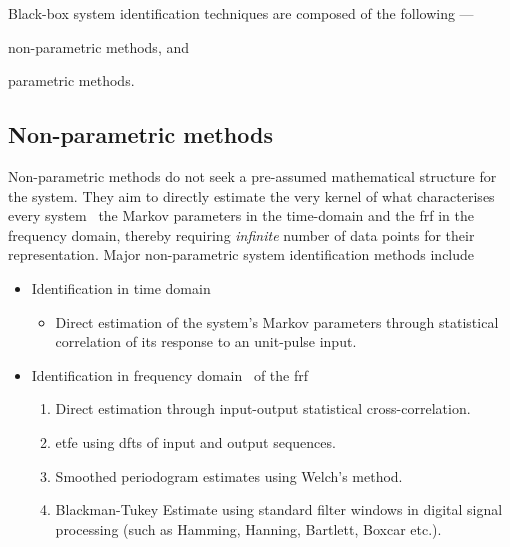 
Black-box system identification techniques are composed of the following ---
\begin{enumerate*}[label=\emph{\alph*})]
     \item non-parametric methods, and
     \item parametric methods.
 \end{enumerate*}

\vspace*{-3mm}
\subsection{Non-parametric methods}
\addlines
Non-parametric methods do not seek  a pre-assumed mathematical structure for the
system. They  aim to  directly estimate  the very  kernel of  what characterises
every system \viz~the Markov parameters in the time-domain  and the \gls{frf}
in the frequency domain, thereby requiring \emph{infinite} number of data points
for  their representation.  Major non-parametric  system identification  methods
include
\begin{itemize}[topsep=-5pt,itemsep=-1pt,partopsep=-5pt, parsep=-1pt]
    \item Identification in time domain
        \begin{itemize}

            \item Direct  estimation of the system's  Markov parameters through
                statistical correlation of its response to an unit-pulse input.

        \end{itemize}
    \item Identification in frequency domain \ie~of the \gls{frf}
        \begin{enumerate}[topsep=1.25pt,itemsep=1.25pt,partopsep=1.25pt, parsep=1.25pt]

            \item   Direct   estimation    through   input-output   statistical
                cross-correlation.

            \item  \gls{etfe} using \glspl{dft} of input and output sequences.

            \item  Smoothed periodogram estimates using Welch's method.

            \item  Blackman-Tukey  Estimate   using  standard  filter
                windows  in digital  signal processing  (such as  Hamming, Hanning,
                Bartlett, Boxcar etc.).

        \end{enumerate}
\end{itemize}

